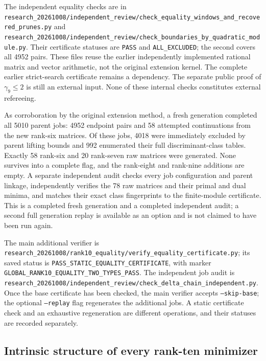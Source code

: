 \documentclass[11pt,a4paper]{article}
\theoremstyle{remark}\newtheorem{remark}[theorem]{Remark}
\newcommand{\file}[1]{{\small\nolinkurl{#1}}}
\begin{document}
The independent equality checks are in \file{research_20261008/independent_review/check_equality_windows_and_recovered_prunes.py} and \file{research_20261008/independent_review/check_boundaries_by_quadratic_module.py}. Their certificate statuses are \file{PASS} and \file{ALL_EXCLUDED}; the second covers all 4952 pairs. These files reuse the earlier independently implemented rational matrix and vector arithmetic, not the original extension kernel. The complete earlier strict-search certificate remains a dependency. The separate public proof of $\gamma_9\le2$ is still an external input. None of these internal checks constitutes external refereeing.

As corroboration by the original extension method, a fresh generation completed all 5010 parent jobs: 4952 endpoint pairs and 58 attempted continuations from the new rank-six matrices. Of these jobs, 4018 were immediately excluded by parent lifting bounds and 992 enumerated their full discriminant-class tables. Exactly 58 rank-six and 20 rank-seven raw matrices were generated. None survives into a complete flag, and the rank-eight and rank-nine additions are empty. A separate independent audit checks every job configuration and parent linkage, independently verifies the 78 raw matrices and their primal and dual minima, and matches their exact class fingerprints to the finite-module certificate. This is a completed fresh generation and a completed independent audit; a second full generation replay is available as an option and is not claimed to have been run again.

The main additional verifier is \file{research_20261008/rank10_equality/verify_equality_certificate.py}; its saved status is \file{PASS_STATIC_EQUALITY_CERTIFICATE}, with marker \file{GLOBAL_RANK10_EQUALITY_TWO_TYPES_PASS}. The independent job audit is \file{research_20261008/independent_review/check_delta_chain_independent.py}. Once the base certificate has been checked, the main verifier accepts \texttt{--skip-base}; the optional \texttt{--replay} flag regenerates the additional jobs. A static certificate check and an exhaustive regeneration are different operations, and their statuses are recorded separately.


\subsection{Intrinsic structure of every rank-ten minimizer}
\end{document}
